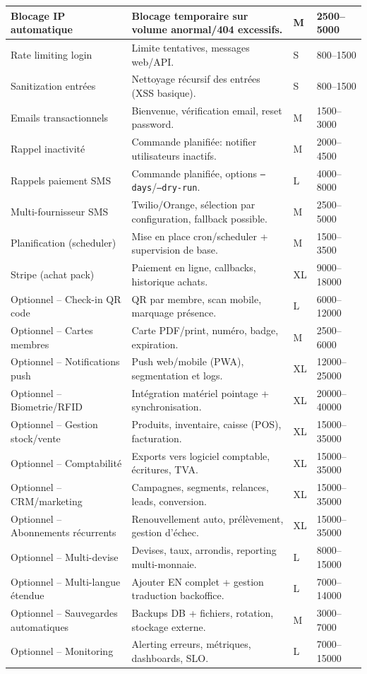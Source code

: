 \documentclass[12pt, a4paper]{article}
\begin{document}
\begin{longtable}{|p{4.2cm}|p{8.2cm}|p{1.6cm}|p{2.0cm}|}
\hline
Blocage IP automatique & Blocage temporaire sur volume anormal/404 excessifs. & M & 2500--5000 \\
\hline
Rate limiting login & Limite tentatives, messages web/API. & S & 800--1500 \\
\hline
Sanitization entrées & Nettoyage récursif des entrées (XSS basique). & S & 800--1500 \\
\hline
Emails transactionnels & Bienvenue, vérification email, reset password. & M & 1500--3000 \\
\hline
Rappel inactivité & Commande planifiée: notifier utilisateurs inactifs. & M & 2000--4500 \\
\hline
Rappels paiement SMS & Commande planifiée, options \texttt{--days}/\texttt{--dry-run}. & L & 4000--8000 \\
\hline
Multi-fournisseur SMS & Twilio/Orange, sélection par configuration, fallback possible. & M & 2500--5000 \\
\hline
Planification (scheduler) & Mise en place cron/scheduler + supervision de base. & M & 1500--3500 \\
\hline
Stripe (achat pack) & Paiement en ligne, callbacks, historique achats. & XL & 9000--18000 \\
\hline

Optionnel -- Check-in QR code & QR par membre, scan mobile, marquage présence. & L & 6000--12000 \\
\hline
Optionnel -- Cartes membres & Carte PDF/print, numéro, badge, expiration. & M & 2500--6000 \\
\hline
Optionnel -- Notifications push & Push web/mobile (PWA), segmentation et logs. & XL & 12000--25000 \\
\hline
Optionnel -- Biometrie/RFID & Intégration matériel pointage + synchronisation. & XL & 20000--40000 \\
\hline
Optionnel -- Gestion stock/vente & Produits, inventaire, caisse (POS), facturation. & XL & 15000--35000 \\
\hline
Optionnel -- Comptabilité & Exports vers logiciel comptable, écritures, TVA. & XL & 15000--35000 \\
\hline
Optionnel -- CRM/marketing & Campagnes, segments, relances, leads, conversion. & XL & 15000--35000 \\
\hline
Optionnel -- Abonnements récurrents & Renouvellement auto, prélèvement, gestion d'échec. & XL & 15000--35000 \\
\hline
Optionnel -- Multi-devise & Devises, taux, arrondis, reporting multi-monnaie. & L & 8000--15000 \\
\hline
Optionnel -- Multi-langue étendue & Ajouter EN complet + gestion traduction backoffice. & L & 7000--14000 \\
\hline
Optionnel -- Sauvegardes automatiques & Backups DB + fichiers, rotation, stockage externe. & M & 3000--7000 \\
\hline
Optionnel -- Monitoring & Alerting erreurs, métriques, dashboards, SLO. & L & 7000--15000 \\
\hline
\end{longtable}
\end{document}
